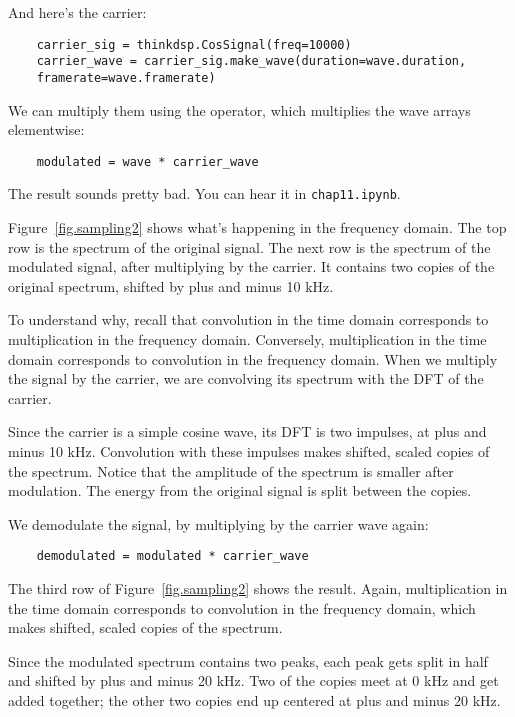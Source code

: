 And here's the carrier:

\begin{verbatim}
	carrier_sig = thinkdsp.CosSignal(freq=10000)
	carrier_wave = carrier_sig.make_wave(duration=wave.duration,
	framerate=wave.framerate)
\end{verbatim}

We can multiply them using the {\tt *} operator, which multiplies
the wave arrays elementwise:

\begin{verbatim}
	modulated = wave * carrier_wave
\end{verbatim}

The result sounds pretty bad.  You can hear it in {\tt chap11.ipynb}.

Figure~\ref{fig.sampling2} shows what's happening in the frequency
domain.  The top row is the spectrum of the original signal.  The
next row is the spectrum of the modulated signal, after multiplying
by the carrier.  It contains two copies of the original spectrum,
shifted by plus and minus 10 kHz.

To understand why, recall that convolution in the time domain corresponds
to multiplication in the frequency domain.  Conversely, multiplication
in the time domain corresponds to convolution in the frequency domain.
When we multiply the signal by the carrier, we are convolving its
spectrum with the DFT of the carrier.

Since the carrier is a simple cosine wave, its DFT is two impulses, at
plus and minus 10 kHz.  Convolution with these impulses makes
shifted, scaled copies of the spectrum.  Notice that the amplitude of
the spectrum is smaller after modulation.  The energy from the original
signal is split between the copies.

We demodulate the signal, by multiplying by the carrier wave again:

\begin{verbatim}
	demodulated = modulated * carrier_wave
\end{verbatim}

The third row of Figure~\ref{fig.sampling2} shows the result.  Again,
multiplication in the time domain corresponds to convolution in the
frequency domain, which makes shifted, scaled copies of the spectrum.

Since the modulated spectrum contains two peaks, each peak gets split
in half and shifted by plus and minus 20 kHz.  Two of the copies
meet at 0 kHz and get added together; the other two copies end up
centered at plus and minus 20 kHz.

